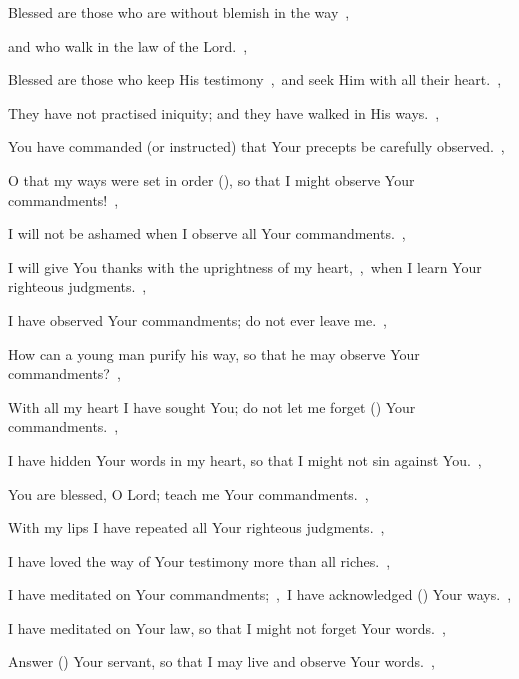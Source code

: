 \documentclass[12pt,twoside,a5paper]{article}
\begin{document}
\begin{normalparskip}
   Blessed are those who are without blemish in the way~\sep


  and who walk in the law of the Lord.~\sep

  Blessed are those who keep His testimony~\sep\ and seek Him with all their heart.~\sep

  They have not practised iniquity; and they have walked in His ways.~\sep

  You have commanded (or instructed) that Your precepts be carefully observed.~\sep

  O that my ways were set in order (), so that I might observe Your commandments!~\sep

  I will not be ashamed when I observe all Your commandments.~\sep

  I will give You thanks with the uprightness of my heart,~\sep\ when I learn Your righteous judgments.~\sep

  I have observed Your commandments; do not ever leave me.~\sep

   How can a young man purify his way, so that he may observe Your commandments?~\sep


  With all my heart I have sought You; do not let me forget () Your commandments.~\sep

  I have hidden Your words in my heart, so that I might not sin against You.~\sep

  You are blessed, O Lord; teach me Your commandments.~\sep

  With my lips I have repeated all Your righteous judgments.~\sep

  I have loved the way of Your testimony more than all riches.~\sep

  I have meditated on Your commandments;~\sep\ I have acknowledged () Your ways.~\sep

  I have meditated on Your law, so that I might not forget Your words.~\sep

   Answer () Your servant, so that I may live and observe Your words.~\sep



\end{normalparskip}
\end{document}
